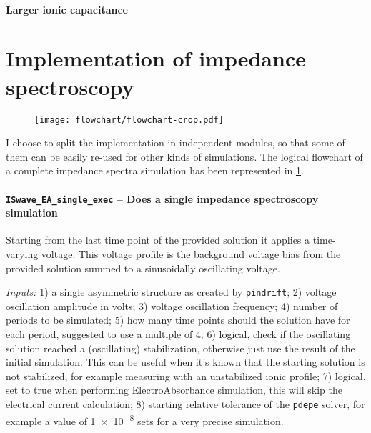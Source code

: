\paragraph{Larger ionic capacitance}


\section{Implementation of impedance spectroscopy}

\begin{figure}
	\centering
	\texttt{[image: flowchart/flowchart-crop.pdf]}
	\label{fig:impedance_flowchart}
\end{figure}

I choose to split the implementation in independent modules, so that some of them can be easily re-used for other kinds of simulations.
The logical flowchart of a complete impedance spectra simulation has been represented in \cref{fig:impedance_flowchart}.


\paragraph{\texttt{ISwave\_EA\_single\_exec} -- Does a single impedance spectroscopy simulation}
Starting from the last time point of the provided solution it applies a time-varying voltage.
This voltage profile is the background voltage bias from the provided solution summed to a sinusoidally oscillating voltage.

\textit{Inputs:} 1) a single asymmetric structure as created by \texttt{pindrift};
2) voltage oscillation amplitude in volts;
3) voltage oscillation frequency;
4) number of periods to be simulated;
5) how many time points should the solution have for
     each period, suggested to use a multiple of 4;
6) logical, check if the oscillating solution reached a
     (oscillating) stabilization, otherwise just use the result of the
     initial simulation. This can be useful when it's known that the
     starting solution is not stabilized, for example measuring with an
     unstabilized ionic profile;
7) logical, set to true when performing ElectroAbsorbance simulation,
     this will skip the electrical current calculation;
8) starting relative tolerance of the \texttt{pdepe} solver, for example a
     value of \num{1e-8} sets for a very precise simulation.

